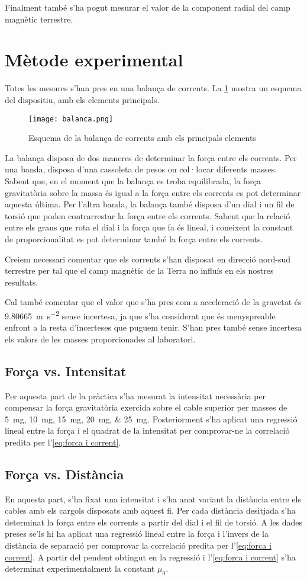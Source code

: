 	Finalment també s'ha pogut mesurar el valor de la component radial del camp magnètic terrestre. 

	\section{Mètode experimental}
	Totes les mesures s'han pres en una balança de corrents. La \cref{fig:balanca} mostra un esquema del dispositiu, amb els elements principals.
	\begin{figure}
		\centering
		\texttt{[image: balanca.png]}
		\caption{Esquema de la balança de corrents amb els principals elements}
		\label{fig:balanca}
	\end{figure}

	La balança disposa de dos maneres de determinar la força entre els corrents. Per una banda, disposa d'una cassoleta de pesos on col·locar diferents masses. Sabent que, en el moment que la balança es troba equilibrada, la força gravitatòria sobre la massa és igual a la força entre els corrents es pot determinar aquesta última. Per l'altra banda, la balança també disposa d'un dial i un fil de torsió que poden contrarrestar la força entre els corrents. Sabent que la relació entre els graus que rota el dial i la força que fa és lineal, i coneixent la constant de proporcionalitat es pot determinar també la força entre els corrents.

	Creiem necessari comentar que els corrents s'han disposat en direcció nord-sud terrestre per tal que el camp magnètic de la Terra no influís en els nostres resultats.

	Cal també comentar que el valor que s'ha pres com a acceleració de la gravetat és \SI{9.80665}{m.s^{-2}} sense incertesa, ja que s'ha considerat que és menyspreable enfront a la resta d'incerteses que puguem tenir. S'han pres també sense incertesa els valors de les masses proporcionades al laboratori.

	\subsection{Força vs. Intensitat}
	Per aquesta part de la pràctica s'ha mesurat la intensitat necessària per compensar la força gravitatòria exercida sobre el cable superior per masses de \SIlist{5; 10; 15; 20; 25}{mg}. Posteriorment s'ha aplicat una regressió lineal entre la força i el quadrat de la intensitat per comprovar-ne la correlació predita per l'\cref{eq:forca i corrent}.

	\subsection{Força vs. Distància}
	En aquesta part, s'ha fixat una intensitat i s'ha anat variant la distància entre els cables amb els cargols disposats amb aquest fi. Per cada distància desitjada s'ha determinat la força entre els corrents a partir del dial i el fil de torsió. A les dades preses se'ls hi ha aplicat una regressió lineal entre la força i l'invers de la distància de separació per comprovar la correlació predita per l'\cref{eq:forca i corrent}. A partir del pendent obtingut en la regressió i l'\cref{eq:forca i corrent} s'ha determinat experimentalment la constant $\mu_0$.

